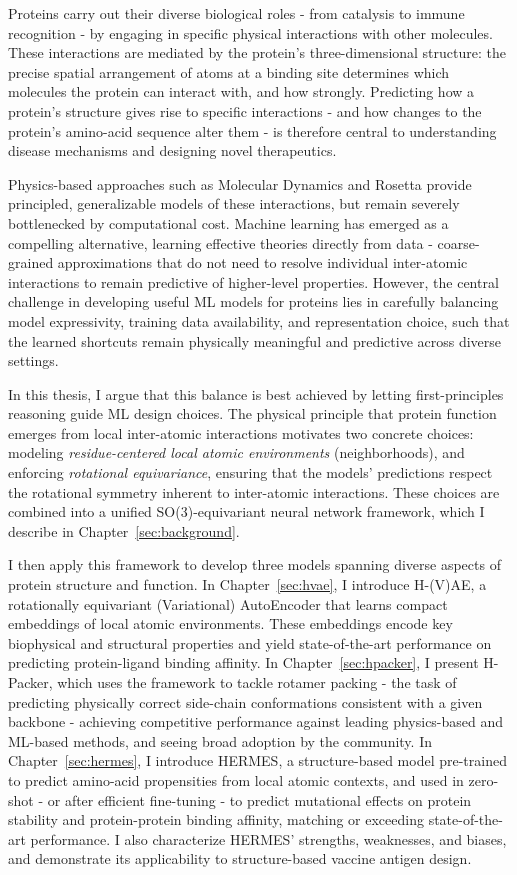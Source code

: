 
Proteins carry out their diverse biological roles - from catalysis to immune recognition - by engaging in specific
physical interactions with other molecules.
These interactions are mediated by the protein's three-dimensional structure: the precise spatial arrangement of
atoms at a binding site determines which molecules the protein can interact with, and how strongly.
Predicting how a protein's structure gives rise to specific interactions - and how changes to the protein's amino-acid
sequence alter them - is therefore central to understanding disease mechanisms and designing novel therapeutics.

Physics-based approaches such as Molecular Dynamics and Rosetta provide principled, generalizable models of these
interactions, but remain severely bottlenecked by computational cost.
Machine learning has emerged as a compelling alternative, learning effective theories directly from data -
coarse-grained approximations that do not need to resolve individual inter-atomic interactions to remain predictive of
higher-level properties.
However, the central challenge in developing useful ML models for proteins lies in carefully balancing model
expressivity, training data availability, and representation choice, such that the learned shortcuts remain
physically meaningful and predictive across diverse settings.

In this thesis, I argue that this balance is best achieved by letting first-principles reasoning guide ML design choices.
The physical principle that protein function emerges from local inter-atomic interactions motivates two concrete choices:
modeling \textit{residue-centered local atomic environments} (neighborhoods), and enforcing \textit{rotational
equivariance}, ensuring that the models' predictions respect the rotational symmetry inherent to inter-atomic interactions.
These choices are combined into a unified SO(3)-equivariant neural network framework, which I describe in
Chapter~\ref{sec:background}.

I then apply this framework to develop three models spanning diverse aspects of protein structure and function.
In Chapter~\ref{sec:hvae}, I introduce H-(V)AE, a rotationally equivariant (Variational) AutoEncoder that learns
compact embeddings of local atomic environments.
These embeddings encode key biophysical and structural properties and yield state-of-the-art performance on predicting
protein-ligand binding affinity.
In Chapter~\ref{sec:hpacker}, I present H-Packer, which uses the framework to tackle rotamer packing - the task of
predicting physically correct side-chain conformations consistent with a given backbone - achieving competitive
performance against leading physics-based and ML-based methods, and seeing broad adoption by the community.
In Chapter~\ref{sec:hermes}, I introduce HERMES, a structure-based model pre-trained to predict amino-acid propensities
from local atomic contexts, and used in zero-shot - or after efficient fine-tuning - to predict mutational effects on
protein stability and protein-protein binding affinity, matching or exceeding state-of-the-art performance.
I also characterize HERMES' strengths, weaknesses, and biases, and demonstrate its applicability to structure-based
vaccine antigen design.

